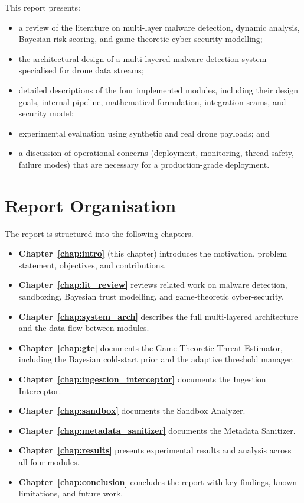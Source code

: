 \documentclass[12pt, a4paper]{report}
\begin{document}
This report presents:
\begin{itemize}
    \item a review of the literature on multi-layer malware detection,
          dynamic analysis, Bayesian risk scoring, and game-theoretic
          cyber-security modelling;
    \item the architectural design of a multi-layered malware detection
          system specialised for drone data streams;
    \item detailed descriptions of the four implemented modules, including
          their design goals, internal pipeline, mathematical formulation,
          integration seams, and security model;
    \item experimental evaluation using synthetic and real drone payloads;
          and
    \item a discussion of operational concerns (deployment, monitoring,
          thread safety, failure modes) that are necessary for a
          production-grade deployment.
\end{itemize}

\section{Report Organisation}

The report is structured into the following chapters.
\begin{itemize}
    \item \textbf{Chapter~\ref{chap:intro}} (this chapter) introduces the
          motivation, problem statement, objectives, and contributions.
    \item \textbf{Chapter~\ref{chap:lit_review}} reviews related work on
          malware detection, sandboxing, Bayesian trust modelling, and
          game-theoretic cyber-security.
    \item \textbf{Chapter~\ref{chap:system_arch}} describes the full
          multi-layered architecture and the data flow between modules.
    \item \textbf{Chapter~\ref{chap:gte}} documents the Game-Theoretic
          Threat Estimator, including the Bayesian cold-start prior and the
          adaptive threshold manager.
    \item \textbf{Chapter~\ref{chap:ingestion_interceptor}} documents the
          Ingestion Interceptor.
    \item \textbf{Chapter~\ref{chap:sandbox}} documents the Sandbox Analyzer.
    \item \textbf{Chapter~\ref{chap:metadata_sanitizer}} documents the
          Metadata Sanitizer.
    \item \textbf{Chapter~\ref{chap:results}} presents experimental results
          and analysis across all four modules.
    \item \textbf{Chapter~\ref{chap:conclusion}} concludes the report with
          key findings, known limitations, and future work.
\end{itemize}
\end{document}
